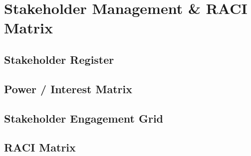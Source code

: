 \chapter{Stakeholder Management \& RACI Matrix}
    \section{Stakeholder Register}
    \section{Power / Interest Matrix}
    \section{Stakeholder Engagement Grid}
    \section{RACI Matrix}